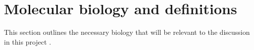 \documentclass[12pt, twoside, a4paper]{report}
\begin{document}





\section{Molecular biology and definitions} \label{bg:bio}
This section outlines the necessary biology that will be relevant to the discussion in this project \cite{RefWorks:106, RefWorks:108, RefWorks:110, RefWorks:111}.
\end{document}
